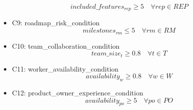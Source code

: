 \documentclass{article}
\begin{document}
\begin{itemize}
\begin{equation*}
            included\_features_{rep} \geq 5 \quad \forall rep \in REP
        \end{equation*}
    \item C9: roadmap\_risk\_condition
        \begin{equation*}
            milestones_{rm} \leq 5 \quad \forall rm \in RM
        \end{equation*}
    \item C10: team\_collaboration\_condition
        \begin{equation*}
            team\_size_{t} \geq 0.8 \quad \forall t \in T
        \end{equation*}
    \item C11: worker\_availability\_condition
        \begin{equation*}
            availability_{w} \geq 0.8 \quad \forall w \in W
        \end{equation*}
    \item C12: product\_owner\_experience\_condition
        \begin{equation*}
            availability_{po} \geq 5 \quad \forall po \in PO
        \end{equation*}
\end{itemize}
\end{document}
